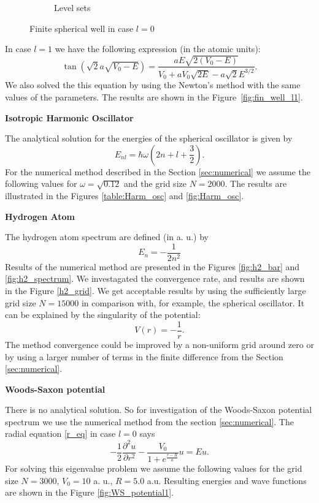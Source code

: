 \documentclass[a4paper, 12pt]{article}
\begin{document}
\begin{figure}[h!]
\begin{subfigure}{.5\textwidth}
  \caption{Level sets}
  \label{fig:wave_func}
\end{subfigure}
\caption{Finite spherical well in case $l=0$}
\label{fig:WS_potential}
\end{figure}

In case $l=1$ we have the following expression (in the atomic units):
$$\tan(\sqrt{2} a \sqrt{V_0-E}) = \frac{a E \sqrt{2(V_0 - E)}}{V_0+a V_0 \sqrt{2E} -a \sqrt{2} E^{3/2}}.$$
We also solved the this equation by using the Newton's method with the same values of the parameters. The results are shown in the Figure~\ref{fig:fin_well_l1}.

\begin{center}
		\large
		\textbf{Isotropic Harmonic Oscillator}		\\[0.5 cm]
\end{center}
The analytical solution for the energies of the spherical oscillator is given by
$$E_{nl} = \hbar \omega (2 n +l+\frac{3}{2}).$$
For the numerical method described in the Section \ref{sec:numerical} we assume the following values for $\omega = \sqrt{0.12}$ and the grid size $N = 2000.$ The results are illustrated in the Figures \ref{table:Harm_osc} and \ref{fig:Harm_osc}.

\begin{center}
		\large
		\textbf{Hydrogen Atom}		\\[0.5 cm]
\end{center}
The hydrogen atom spectrum are defined (in a. u.) by 
$$E_n = -\frac{1}{2 n^2}$$
Results of the numerical method are presented in the Figures \ref{fig:h2_bar} and \ref{fig:h2_spectrum}. We investagated the convergence rate, and results are shown in the Figure \ref{h2_grid}.
We get acceptable results by using the sufficiently large grid size $N = 15000$ in comparison with, for example, the spherical oscillator. It can be explained by the singularity of the potential:
$$V(r) = -\frac{1}{r}.$$
The method convergence could be improved by a non-uniform grid around zero or by using a larger number of terms in the finite difference from the Section \ref{sec:numerical}.

\begin{center}
		\large
		\textbf{Woods-Saxon potential}		\\[0.5 cm]
\end{center}
There is no analytical solution. So for investigation of the Woods-Saxon potential spectrum we use the numerical method from the section \ref{sec:numerical}. The radial equation \eqref{r_eq} in case $l=0$ says 
$$-\frac{1}{2}\frac{\partial^2 u}{\partial r^2 }- \frac{V_0}{1+e^\frac{r-R}{a}}u = Eu.$$
For solving this eigenvalue problem we assume the following values for the grid size $N = 3000$,  $V_0 = 10$ a. u., $R = 5.0$ a.u. Resulting energies and wave functions are shown in the Figure \ref{fig:WS_potential1}.
\end{document}
